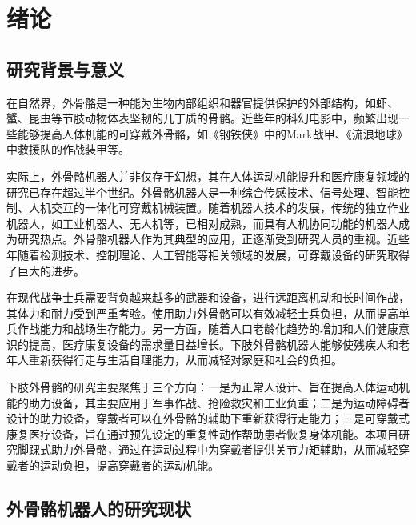 \chapter{绪论}
\section{研究背景与意义}
在自然界，外骨骼是一种能为生物内部组织和器官提供保护的外部结构，如虾、蟹、昆虫等节肢动物体表坚韧的几丁质的骨骼。近些年的科幻电影中，频繁出现一些能够提高人体机能的可穿戴外骨骼，如《钢铁侠》中的Mark战甲、《流浪地球》中救援队的作战装甲等。

实际上，外骨骼机器人并非仅存于幻想，其在人体运动机能提升\cite{p1}和医疗康复\cite{p2}领域的研究已存在超过半个世纪。外骨骼机器人是一种综合传感技术、信号处理、智能控制、人机交互的一体化可穿戴机械装置。随着机器人技术的发展，传统的独立作业机器人，如工业机器人、无人机等，已相对成熟，而具有人机协同功能的机器人成为研究热点。外骨骼机器人作为其典型的应用，正逐渐受到研究人员的重视。近些年随着检测技术、控制理论、人工智能等相关领域的发展，可穿戴设备的研究取得了巨大的进步。

在现代战争士兵需要背负越来越多的武器和设备，进行远距离机动和长时间作战，其体力和耐力受到严重考验。使用助力外骨骼可以有效减轻士兵负担，从而提高单兵作战能力和战场生存能力。另一方面，随着人口老龄化趋势的增加和人们健康意识的提高，医疗康复设备的需求量日益增长。下肢外骨骼机器人能够使残疾人和老年人重新获得行走与生活自理能力，从而减轻对家庭和社会的负担。

下肢外骨骼的研究主要聚焦于三个方向：一是为正常人设计、旨在提高人体运动机能的助力设备，其主要应用于军事作战、抢险救灾和工业负重；二是为运动障碍者设计的助力设备，穿戴者可以在外骨骼的辅助下重新获得行走能力；三是可穿戴式康复医疗设备，旨在通过预先设定的重复性动作帮助患者恢复身体机能。本项目研究脚踝式助力外骨骼，通过在运动过程中为穿戴者提供关节力矩辅助，从而减轻穿戴者的运动负担，提高穿戴者的运动机能。

\section{外骨骼机器人的研究现状}

